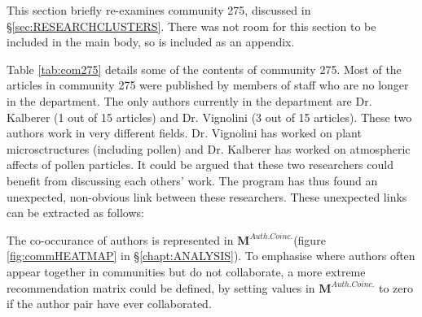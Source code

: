 \addtocounter{page}{1}
\label{sec:neonicotinoids}
This section briefly re-examines community 275, discussed in \S\ref{sec:RESEARCHCLUSTERS}. There was not room for this section to be included in the main body, so is included as an appendix. 

Table \ref{tab:com275} details some of the contents of community 275. Most of the articles in community 275 were published by members of staff who are no longer in the department. The only authors currently in the department are Dr. Kalberer (1 out of 15 articles) and Dr. Vignolini (3 out of 15 articles). These two authors work in very different fields. Dr. Vignolini has worked on plant microsctructures (including pollen) and Dr. Kalberer has worked on atmospheric affects of pollen particles. It could be argued that these two researchers could benefit from discussing each others' work. The program has thus found an unexpected, non-obvious link between these researchers. These unexpected links can be extracted as follows:

The co-occurance of authors is represented in $\mathbf{M}^{Auth. Coinc.}$(figure \ref{fig:commHEATMAP} in \S\ref{chapt:ANALYSIS}). To emphasise where authors often appear together in communities but do not collaborate, a more extreme recommendation matrix could be defined, by setting values in $\mathbf{M}^{Auth. Coinc.}$ to zero if the author pair have ever collaborated. 

